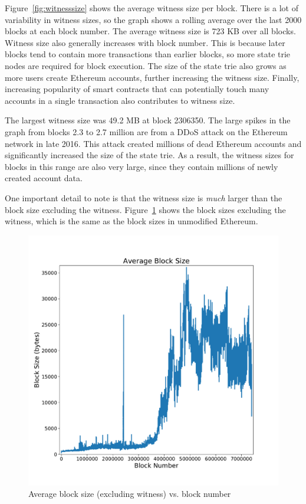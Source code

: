 \documentclass[12pt]{article}
\begin{document}
Figure~\ref{fig:witnesssize} shows the average witness size per block. There is a lot of variability in witness sizes, so the graph shows a rolling average over the last 2000 blocks at each block number. The average witness size is 723 KB over all blocks. Witness size also generally increases with block number. This is because later blocks tend to contain more transactions than earlier blocks, so more state trie nodes are required for block execution. The size of the state trie also grows as more users create Ethereum accounts, further increasing the witness size. Finally, increasing popularity of smart contracts that can potentially touch many accounts in a single transaction also contributes to witness size.

The largest witness size was 49.2 MB at block 2306350. The large spikes in the graph from blocks 2.3 to 2.7 million are from a DDoS attack on the Ethereum network in late 2016. This attack created millions of dead Ethereum accounts and significantly increased the size of the state trie. As a result, the witness sizes for blocks in this range are also very large, since they contain millions of newly created account data.

One important detail to note is that the witness size is \emph{much} larger than the block size excluding the witness. Figure~\ref{fig:blocksize} shows the block sizes excluding the witness, which is the same as the block sizes in unmodified Ethereum.

\begin{figure}[H]
  \centering
  \includegraphics[width=\textwidth]{../figures/results/graphs/background/block-size.pdf}
  \caption{Average block size (excluding witness) vs. block number}
  \label{fig:blocksize}
\end{figure}
\end{document}
